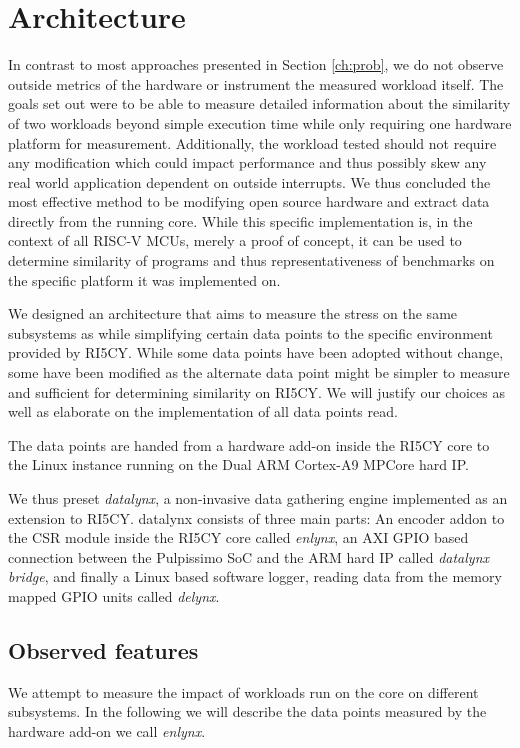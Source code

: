 \documentclass[../bachelor_paper.tex]{subfiles}
\begin{document}
\chapter{Architecture}
    \label{ch:arch}
In contrast to most approaches presented in Section \ref{ch:prob}, we do not observe outside metrics of the hardware or instrument the measured workload itself. The goals set out were to be able to measure detailed information about the similarity of two workloads beyond simple execution time while only requiring one hardware platform for measurement. Additionally, the workload tested should not require any modification which could impact performance and thus possibly skew any real world application dependent on outside interrupts. We thus concluded the most effective method to be modifying open source hardware and extract data directly from the running core. While this specific implementation is, in the context of all RISC-V \acp{MCU}, merely a proof of concept, it can be used to determine similarity of programs and thus representativeness of benchmarks on the specific platform it was implemented on.

We designed an architecture that aims to measure the stress on the same subsystems as \cite{phansalkarMeasuringProgramSimilarity2005,joshiMeasuringBenchmarkSimilarity2006,eeckhoutQuantifyingImpactInput} while simplifying certain data points to the specific environment provided by RI5CY. While some data points have been adopted without change, some have been modified as the alternate data point might be simpler to measure and sufficient for determining similarity on RI5CY. We will justify our choices as well as elaborate on the implementation of all data points read.

The data points are handed from a hardware add-on inside the RI5CY core to the Linux instance running on the Dual ARM Cortex-A9 MPCore hard \ac{IP}.

We thus preset \emph{datalynx}, a non-invasive data gathering engine implemented as an extension to RI5CY. datalynx consists of three main parts: An encoder addon to the \ac{CSR} module inside the RI5CY core called \emph{enlynx}, an AXI GPIO based connection between the Pulpissimo \ac{SoC} and the ARM hard \ac{IP} called \emph{datalynx bridge}, and finally a Linux based software logger, reading data from the memory mapped GPIO units called \emph{delynx}.

\section{Observed features}
We attempt to measure the impact of workloads run on the core on different subsystems. In the following we will describe the data points measured by the hardware add-on we call \emph{enlynx}.
\end{document}
